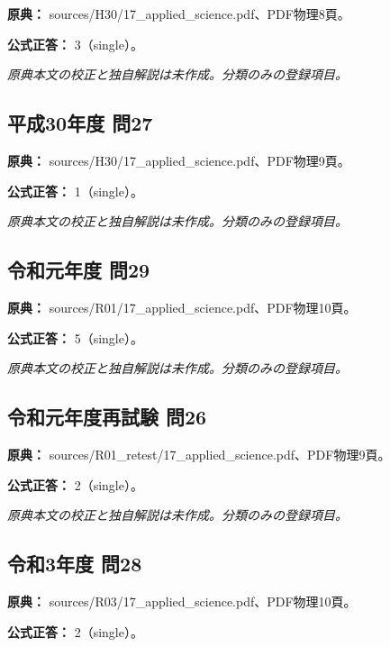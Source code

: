 \noindent\textbf{原典：} sources/H30/17\_applied\_science.pdf、PDF物理8頁。

\textbf{公式正答：} 3（single）。

\par\textit{原典本文の校正と独自解説は未作成。分類のみの登録項目。}

\subsection{平成30年度 問27}
\label{q:h30-reg-applied-27}

\noindent\textbf{原典：} sources/H30/17\_applied\_science.pdf、PDF物理9頁。

\textbf{公式正答：} 1（single）。

\par\textit{原典本文の校正と独自解説は未作成。分類のみの登録項目。}

\subsection{令和元年度 問29}
\label{q:r01-reg-applied-29}

\noindent\textbf{原典：} sources/R01/17\_applied\_science.pdf、PDF物理10頁。

\textbf{公式正答：} 5（single）。

\par\textit{原典本文の校正と独自解説は未作成。分類のみの登録項目。}

\subsection{令和元年度再試験 問26}
\label{q:r01-ret-applied-26}

\noindent\textbf{原典：} sources/R01\_retest/17\_applied\_science.pdf、PDF物理9頁。

\textbf{公式正答：} 2（single）。

\par\textit{原典本文の校正と独自解説は未作成。分類のみの登録項目。}

\subsection{令和3年度 問28}
\label{q:r03-reg-applied-28}

\noindent\textbf{原典：} sources/R03/17\_applied\_science.pdf、PDF物理10頁。

\textbf{公式正答：} 2（single）。


